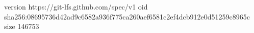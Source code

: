 version https://git-lfs.github.com/spec/v1
oid sha256:08695736d42ad9c6582a936f775ca260aef6581c2ef4dcb912e0d51259c8965c
size 146753
